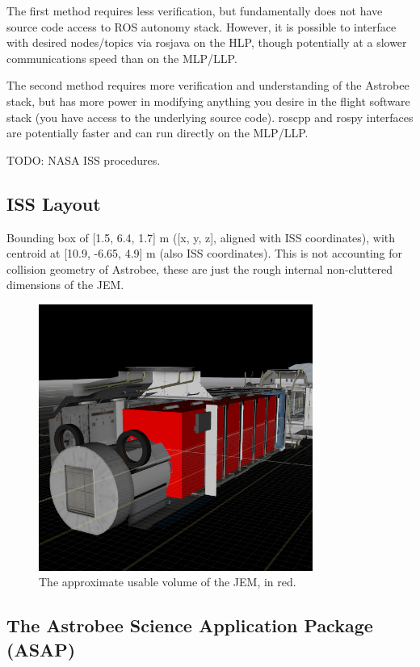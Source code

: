 \documentclass{article}
\begin{document}
The first method requires less verification, but fundamentally does not have source code access to ROS autonomy stack. However, it is possible to interface with desired nodes/topics via rosjava on the HLP, though potentially at a slower communications speed than on the MLP/LLP.

The second method requires more verification and understanding of the Astrobee stack, but has more power in modifying anything you desire in the flight software stack (you have access to the underlying source code). roscpp and rospy interfaces are potentially faster and can run directly on the MLP/LLP.

TODO: NASA ISS procedures.

\subsection{ISS Layout}

Bounding box of [1.5, 6.4, 1.7] m ([x, y, z], aligned with ISS coordinates), with centroid at [10.9, -6.65, 4.9] m (also ISS coordinates). This is not accounting for collision geometry of Astrobee, these are just the rough internal non-cluttered dimensions of the JEM.

\begin{figure}[h!]
	\centering
	\includegraphics[width=0.8\textwidth]{img/ISS_volume.png}
	\caption{The approximate usable volume of the JEM, in red.}
\end{figure}


\subsection{The Astrobee Science Application Package (ASAP)}
\end{document}
